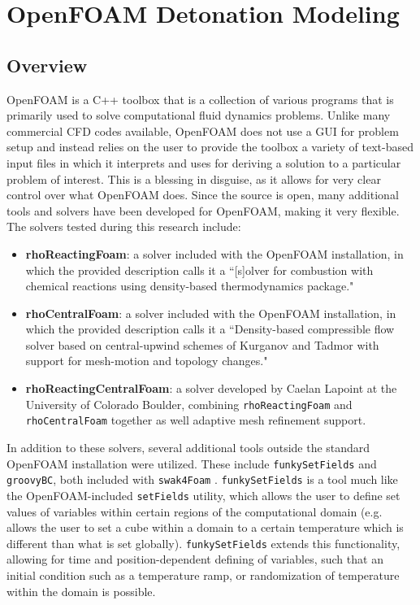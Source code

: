 \chapter{OpenFOAM Detonation Modeling}
\label{ofchap}


\section{Overview}
OpenFOAM is a C++ toolbox that is a collection of various programs that is primarily used to solve computational fluid dynamics problems. Unlike many commercial CFD codes available, OpenFOAM does not use a GUI for problem setup and instead relies on the user to provide the toolbox a variety of text-based input files in which it interprets and uses for deriving a solution to a particular problem of interest. This is a blessing in disguise, as it allows for very clear control over what OpenFOAM does. Since the source is open, many additional tools and solvers have been developed for OpenFOAM, making it very flexible. The solvers tested during this research include:
\begin{itemize}
    \item \textbf{rhoReactingFoam}: a solver included with the OpenFOAM installation, in which the provided description calls it a ``[s]olver for combustion with chemical reactions using density-based thermodynamics package."
    \item \textbf{rhoCentralFoam}: a solver included with the OpenFOAM installation, in which the provided description calls it a ``Density-based compressible flow solver based on central-upwind schemes of Kurganov and Tadmor with support for mesh-motion and topology changes."
    \item \textbf{rhoReactingCentralFoam}: a solver developed by Caelan Lapoint at the University of Colorado Boulder, combining \verb|rhoReactingFoam| and \verb|rhoCentralFoam| together as well adaptive mesh refinement support. 
\end{itemize}

In addition to these solvers, several additional tools outside the standard OpenFOAM installation were utilized. These include \verb|funkySetFields| and \verb|groovyBC|, both included with \verb|swak4Foam| \cite{swak4foam}. \verb|funkySetFields| is a tool much like the OpenFOAM-included \verb|setFields| utility, which allows the user to define set values of variables within certain regions of the computational domain (e.g. allows the user to set a cube within a domain to a certain temperature which is different than what is set globally). \verb|funkySetFields| extends this functionality, allowing for time and position-dependent defining of variables, such that an initial condition such as a temperature ramp, or randomization of temperature within the domain is possible. 


